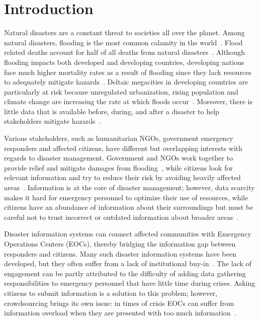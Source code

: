 \chapter{Introduction} Natural disasters are a constant threat to societies all
over the planet. Among natural disasters, flooding is the most common calamity
in the world~\cite{chanFloodRiskAsia2012}.  Flood related deaths account for
half of all deaths from natural disasters~\cite{ohlFloodingHumanHealth2000}.
Although flooding impacts both developed and developing countries, developing
nations face much higher mortality rates as a result of flooding since they lack
resources to adequately mitigate
hazards~\cite{quarantelliUrbanVulnerabilityDisasters2003,
ahernGlobalHealthImpacts2005}. Deltaic megacities in
developing countries are particularly at risk because unregulated
urbanization, rising population and climate change are increasing the rate at
which floods occur~\cite{chanFloodRiskAsia2012}. Moreover, there is little data
that is available before, during, and after a disaster to help stakeholders
mitigate hazards~\cite{meierDigitalHumanitariansHow2015}.

Various stakeholders, such as humanitarian NGOs, government emergency
responders and affected citizens, have
different but overlapping interests with regards to disaster management.
Government and NGOs work together to provide relief and mitigate damages from
flooding~\cite{chanResilientFloodRisk2018}, while citizens
look for relevant information and try to reduce their
risk by avoiding heavily affected
areas~\cite{viewegMicrobloggingTwoNatural2010}. Information is at the core of
disaster management; however, data scarcity makes it hard for emergency
personnel to optimize their use of resources, while citizens have an abundance
of information about their surroundings but must be careful not to trust
incorrect or outdated information about broader
areas~\cite{quarantelliProblematicalAspectsInformation1997}.

Disaster information systems can connect affected communities with
Emergency Operations Centers (EOCs), thereby bridging the information gap
between responders and citizens. Many such disaster information systems have
been developed, but they often suffer from a lack of institutional
buy-in~\cite{aminDataNaturalDisasters2008}. The lack of engagement can be partly
attributed to the difficulty of adding data gathering responsibilities to
emergency personnel that have little time during crises. Asking citizens to
submit information is a solution to this problem; however, crowdsourcing brings
its own issue: in times of crisis EOCs can suffer from information overload when
they are presented with too much
information~\cite{tierneyFacingUnexpectedDisaster2001}.

